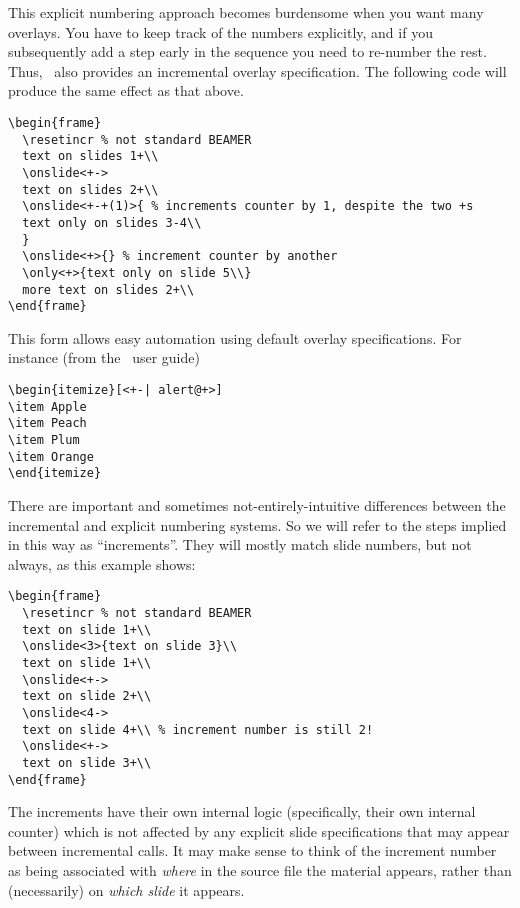 \documentclass[a4paper]{ltxdoc}
\begin{document}
This explicit numbering approach becomes burdensome when you want many overlays.
You have to keep track of the numbers explicitly, and if you subsequently add a
step early in the sequence you need to re-number the rest.  Thus, \beamer\ also
provides an incremental overlay specification.  The following code will produce
the same effect as that above.  \example
\begin{verbatim}
\begin{frame}
  \resetincr % not standard BEAMER
  text on slides 1+\\
  \onslide<+->
  text on slides 2+\\
  \onslide<+-+(1)>{ % increments counter by 1, despite the two +s
  text only on slides 3-4\\
  } 
  \onslide<+>{} % increment counter by another
  \only<+>{text only on slide 5\\}
  more text on slides 2+\\
\end{frame}
\end{verbatim}
This form allows easy automation using default overlay specifications.  For
instance (from the \beamer\ user guide) \example
\begin{verbatim}
\begin{itemize}[<+-| alert@+>]
\item Apple
\item Peach
\item Plum
\item Orange
\end{itemize}
\end{verbatim}
There are important and sometimes not-entirely-intuitive differences between the
incremental and explicit numbering systems.  So we will refer to the steps
implied in this way as ``increments''.  They will mostly match slide numbers,
but not always, as this example shows: \example
\begin{verbatim}
\begin{frame}
  \resetincr % not standard BEAMER
  text on slide 1+\\
  \onslide<3>{text on slide 3}\\
  text on slide 1+\\
  \onslide<+->
  text on slide 2+\\
  \onslide<4->
  text on slide 4+\\ % increment number is still 2!
  \onslide<+->
  text on slide 3+\\
\end{frame}
\end{verbatim}
The increments have their own internal logic (specifically, their own internal
counter) which is not affected by any explicit slide specifications that may
appear between incremental calls.  It may make sense to think of the increment
number as being associated with \emph{where} in the source file the material
appears, rather than (necessarily) on \emph{which slide} it appears.
\end{document}
